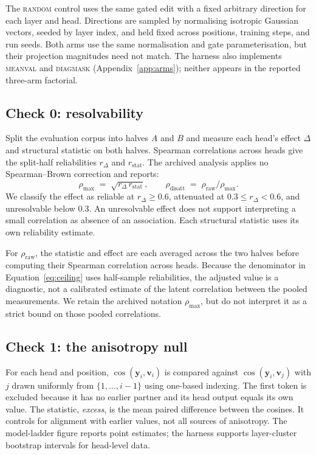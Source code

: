\documentclass{article} %
\newcommand{\yv}{\mathbf{y}}
\begin{document}
The \textsc{random} control uses the same gated edit with a fixed arbitrary
direction for each layer and head. Directions are sampled by normalising
isotropic Gaussian vectors, seeded by layer index, and held fixed across
positions, training steps, and run seeds. Both arms use the same normalisation
and gate parameterisation, but their projection magnitudes need not match.
The harness also implements \textsc{meanval} and \textsc{diagmask}
(Appendix~\ref{app:arms}); neither appears in the reported three-arm factorial.

\subsection{Check 0: resolvability}

Split the evaluation corpus into halves $A$ and $B$ and measure each head's
effect $\Delta$ and structural statistic on both halves. Spearman
correlations across heads give the split-half reliabilities $r_\Delta$ and
$r_{\text{stat}}$. The archived analysis applies no Spearman--Brown
correction and reports:
%
\begin{equation}
\rho_{\max} \;=\; \sqrt{r_\Delta \, r_{\text{stat}}},
\qquad
\rho_{\text{disatt}} \;=\; \rho_{\text{raw}} / \rho_{\max}.
\label{eq:ceiling}
\end{equation}
%
We classify the effect as reliable at $r_\Delta \ge 0.6$, attenuated at
$0.3 \le r_\Delta < 0.6$, and unresolvable below $0.3$. An unresolvable
effect does not support interpreting a small correlation as absence of an
association. Each structural statistic uses its own reliability estimate.

For $\rho_{\text{raw}}$, the statistic and effect are each averaged across
the two halves before computing their Spearman correlation across heads.
Because the denominator in Equation~\ref{eq:ceiling} uses half-sample
reliabilities, the adjusted value is a diagnostic, not a calibrated estimate
of the latent correlation between the pooled measurements. We retain the
archived notation $\rho_{\max}$, but do not interpret it as a strict bound
on those pooled correlations.

\subsection{Check 1: the anisotropy null}

For each head and position, $\cos(\yv_i, \mathbf{v}_i)$ is compared against
$\cos(\yv_i, \mathbf{v}_j)$ with $j$ drawn uniformly from
$\{1,\dots,i-1\}$ using one-based indexing. The first token is excluded
because it has no earlier partner and its head output equals its own value.
The statistic, \emph{excess}, is the mean paired difference between the
cosines. It controls for alignment with earlier values, not all sources of
anisotropy. The model-ladder figure reports point estimates; the harness
supports layer-cluster bootstrap intervals for head-level data.
\end{document}
